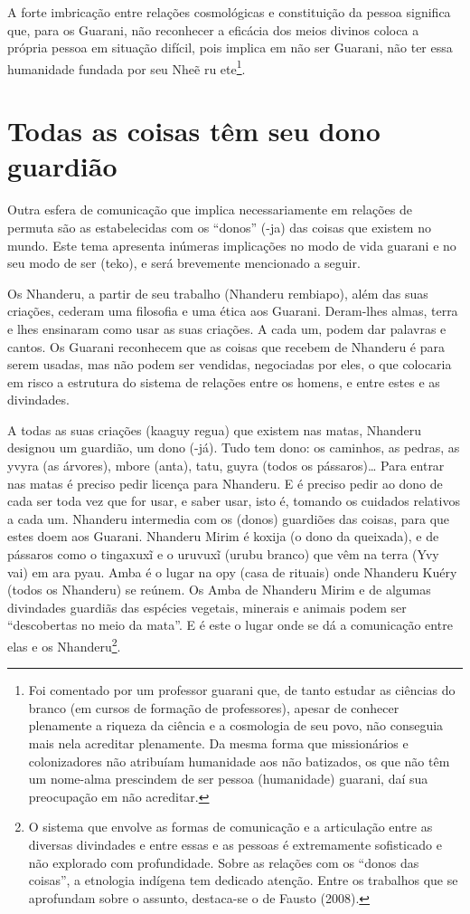 A forte imbricação entre relações cosmológicas e constituição da pessoa
significa que, para os Guarani, não reconhecer a eficácia dos meios
divinos coloca a própria pessoa em situação difícil, pois implica em
não ser Guarani, não ter essa humanidade fundada por seu  Nheẽ ru
ete\footnote{Foi comentado por um professor guarani que, de tanto
estudar as ciências do branco (em cursos de formação de professores),
apesar de conhecer plenamente a riqueza da ciência e a cosmologia de
seu povo, não conseguia mais nela acreditar plenamente. Da mesma forma
que missionários e colonizadores não atribuíam humanidade aos não
batizados, os que não têm um nome-alma prescindem de ser pessoa
(humanidade) guarani, daí sua preocupação em não acreditar.}.  

\section{Todas as coisas têm seu dono guardião}

Outra esfera de comunicação que implica necessariamente em relações de
permuta são as estabelecidas com os ``donos'' (-ja) das coisas que
existem no mundo. Este tema apresenta inúmeras implicações no modo de
vida guarani e no seu modo de ser (teko), e será brevemente mencionado
a seguir.  

Os Nhanderu, a partir de seu trabalho (Nhanderu rembiapo), além das suas
criações, cederam uma filosofia e uma ética aos Guarani. Deram-lhes
almas, terra e lhes ensinaram como usar as suas criações. A cada um,
podem dar palavras e cantos. Os Guarani reconhecem que as coisas que
recebem de Nhanderu é para serem usadas, mas não podem ser vendidas,
negociadas por eles, o que colocaria em risco a estrutura do sistema de
relações entre os homens, e entre estes e as divindades. 

A todas as suas criações (kaaguy regua) que existem nas matas, Nhanderu
designou um guardião, um dono (-já). Tudo tem dono: os caminhos, as
pedras, as yvyra (as árvores), mbore (anta), tatu, guyra (todos os
pássaros)\ldots{} Para entrar nas matas é preciso pedir licença para
Nhanderu. E é preciso pedir ao dono de cada ser toda vez que for usar,
e saber usar, isto é, tomando os cuidados relativos a cada um. Nhanderu
intermedia com os (donos) guardiões das coisas, para que estes doem aos
Guarani.  Nhanderu Mirim é koxija (o dono da queixada), e de pássaros
como o tingaxuxĩ e o
uruvuxĩ (urubu branco) que vêm na terra (Yvy vai)
em ara pyau. Amba é o lugar na opy (casa de rituais) onde Nhanderu
Kuéry (todos os Nhanderu) se reúnem. Os Amba de Nhanderu Mirim e de
algumas divindades guardiãs das espécies vegetais, minerais e animais
podem ser ``descobertas no meio da mata''. E é este o lugar onde se dá a
comunicação entre elas e os Nhanderu\footnote{O sistema que envolve as
formas de comunicação e a articulação entre as diversas divindades e
entre essas e as pessoas é extremamente sofisticado e não explorado com
profundidade. Sobre as relações com os ``donos das coisas'', a etnologia
indígena tem dedicado atenção. Entre os trabalhos que se aprofundam
sobre o assunto, destaca-se o de Fausto (2008). }. 

